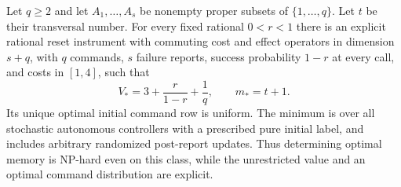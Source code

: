 \begin{theorem}
\label{thm:r77-reset-universality}
Let $q\ge2$ and let $A_1,\ldots,A_s$ be nonempty proper subsets of
$\{1,\ldots,q\}$.  Let $t$ be their transversal number.  For every
fixed rational $0<r<1$ there is an explicit rational reset
instrument with commuting cost and effect operators in dimension $s+q$, with $q$ commands, $s$ failure reports,
success probability $1-r$ at every call, and costs in $[1,4]$, such
that
\[
 V_*=3+\frac{r}{1-r}+\frac1q,
 \qquad m_*=t+1.
\]
Its unique optimal initial command row is uniform.  The minimum is
over all stochastic autonomous controllers with a prescribed pure
initial label, and includes arbitrary randomized post-report updates.
Thus determining optimal memory is NP-hard even on this class, while
the unrestricted value and an optimal command distribution are explicit.
\end{theorem}
